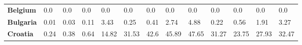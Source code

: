 \begin{table}[H]
{\begin{tabular}{lllllllllllll}
            \textbf{Belgium}                                   &
            0.0                                                &
            0.0                                                &
            0.0                                                &
            0.0                                                &
            0.0                                                &
            0.0                                                &
            0.0                                                &
            0.0                                                &
            0.0                                                &
            0.0                                                &
            0.0                                                &
            0.0                                                  \\
            \textbf{Bulgaria}                                  &
            0.01                                               &
            0.03                                               &
            0.11                                               &
            3.43                                               &
            0.25                                               &
            0.41                                               &
            2.74                                               &
            4.88                                               &
            0.22                                               &
            0.56                                               &
            1.91                                               &
            3.27                                                 \\
            \textbf{Croatia}                                   &
            0.24                                               &
            0.38                                               &
            0.64                                               &
            14.82                                              &
            31.53                                              &
            42.6                                               &
            45.89                                              &
            47.65                                              &
            31.27                                              &
            23.75                                              &
            27.93                                              &
            32.47                                                \\

\end{tabular}}
\end{table}
